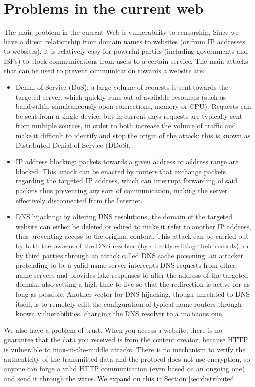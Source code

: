 \documentclass[mscthesis]{usiinfthesis}
\begin{document}
\section{Problems in the current web}
The main problem in the current Web is vulnerability to censorship. Since we have a direct relationship from domain names to websites (or from IP addresses to websites), it is relatively easy for powerful parties (including governments and ISPs) to block communications from users to a certain service. 
The main attacks that can be used to prevent communication towards a website are:
\begin{itemize}
	\item Denial of Service (DoS): a large volume of requests is sent towards the targeted server, which quickly runs out of available resources (such as bandwidth, simultaneously open connections, memory or CPU). Requests can be sent from a single device, but in current days requests are typically sent from multiple sources, in order to both increase the volume of traffic and make it difficult to identify and stop the origin of the attack: this is known as Distributed Denial of Service (DDoS).
	\item IP address blocking: packets towards a given address or address range are blocked. This attack can be enacted by routers that exchange packets regarding the targeted IP address, which can interrupt forwarding of said packets thus preventing any sort of communication, making the server effectively disconnected from the Internet.
	\item DNS hijacking: by altering DNS resolutions, the domain of the targeted website can either be deleted or edited to make it refer to another IP address, thus preventing access to the original content. This attack can be carried out by both the owners of the DNS resolver (by directly editing their records), or by third parties through an attack called DNS cache poisoning: an attacker pretending to be a valid name server intercepts DNS requests from other name servers and provides fake responses to alter the address of the targeted domain, also setting a high time-to-live so that the redirection is active for as long as possible. Another vector for DNS hijacking, though unrelated to DNS itself, is to remotely edit the configuration of typical home routers through known vulnerabilities, changing the DNS resolver to a malicious one.
\end{itemize}

We also have a problem of trust. When you access a website, there is no guarantee that the data you received is from the content creator, because HTTP is vulnerable to man-in-the-middle attacks. There is no mechanism to verify the authenticity of the transmitted data and the protocol does not use encryption, so anyone can forge a valid HTTP communication (even based on an ongoing one) and send it through the wires. We expand on this in Section \ref{sec:distributed}.
\end{document}
